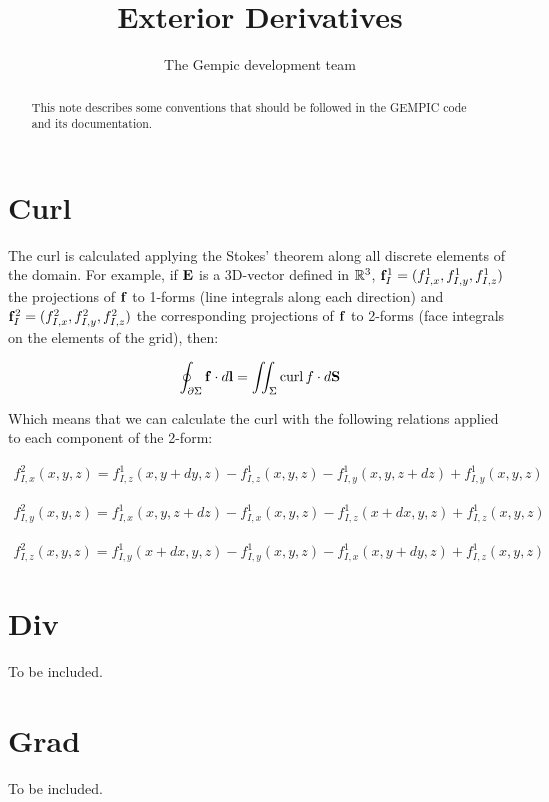 \documentclass[11pt]{article}
\title{Exterior Derivatives}
\author[1]{The Gempic development team}
\affil[1]{Max-Planck-Institut f\"ur Plasmaphysik, Garching, Germany}
\begin{document}
\maketitle

\begin{abstract}
This note describes some conventions that should be followed in the GEMPIC code
and its documentation.
\end{abstract}

\tableofcontents

\section{Curl}
The curl is calculated applying the Stokes' theorem along all discrete elements of the domain. For example, if $\mathbf{E}$ is a 3D-vector defined in $\mathbb{R}^3$, $\mathbf{f}^1_{I} = (f^1_{I,x}, f^1_{I,y}, f^1_{I,z})$ the projections of $\mathbf{f}$ to 1-forms (line integrals along each direction) and $\mathbf{f}^2_{I} = (f^2_{I,x}, f^2_{I,y}, f^2_{I,z})$ the corresponding projections of $\mathbf{f}$ to 2-forms (face integrals on the elements of the grid), then:

\begin{equation}
    \oint_{\partial \Sigma} \mathbf{f} \cdot d\mathbf{l} = \iint_{\Sigma} \operatorname{curl} f \cdot d\mathbf{S}
\end{equation}

Which means that we can calculate the curl with the following relations applied to each component of the 2-form:

\begin{align}
    f^2_{I,x}(x, y, z) = f^1_{I,z}(x, y + dy, z) - f^1_{I,z}(x, y, z) - f^1_{I,y}(x, y, z + dz) + f^1_{I,y}(x, y, z)
\end{align}

\begin{align}
    f^2_{I,y}(x, y, z) = f^1_{I,x}(x, y, z + dz) - f^1_{I,x}(x, y, z) - f^1_{I,z}(x + dx, y, z) + f^1_{I,z}(x, y, z)
\end{align}

\begin{align}
    f^2_{I,z}(x, y, z) = f^1_{I,y}(x + dx, y, z) - f^1_{I,y}(x, y, z) - f^1_{I,x}(x, y + dy, z) + f^1_{I,z}(x, y, z)
\end{align}

\section{Div}
To be included.

\section{Grad}
To be included.
\end{document}
